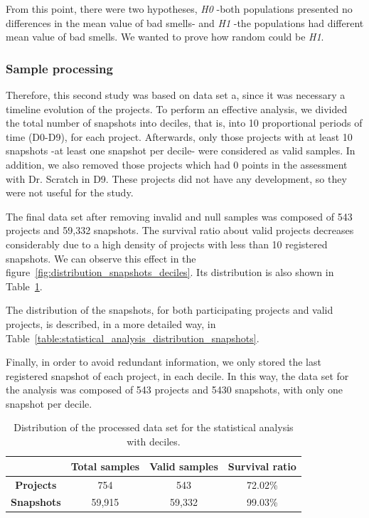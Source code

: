 From this point, there were two hypotheses, \textit{H0} -both populations presented no differences in the mean value of bad smells- and \textit{H1} -the populations had different mean value of bad smells. We wanted to prove how random could be \textit{H1}.   


\subsubsection{Sample processing}
\label{subsubsec:sample_processing}

Therefore, this second study was based on data set a, since it was necessary a timeline evolution of the projects. To perform an effective analysis, we divided the total number of snapshots into deciles, that is, into 10 proportional periods of time (D0-D9), for each project. Afterwards, only those projects with at least 10 snapshots -at least one snapshot per decile- were considered as valid samples. In addition, we also removed those projects which had 0 points in the assessment with Dr. Scratch in D9. These projects did not have any development, so they were not useful for the study. 

The final data set after removing invalid and null samples was composed of 543 projects and 59,332 snapshots. The survival ratio about valid projects decreases considerably due to a high density of projects with less than 10 registered snapshots. We can observe this effect in the figure~\ref{fig:distribution_snapshots_deciles}. Its distribution is also shown in Table~\ref{table:statistical_analysis_distribution_samples}. 

The distribution of the snapshots, for both participating projects and valid projects, is described, in a more detailed way, in Table~\ref{table:statistical_analysis_distribution_snapshots}.

Finally, in order to avoid redundant information, we only stored the last registered snapshot of each project, in each decile. In this way, the data set for the analysis was composed of 543 projects and 5430 snapshots, with only one snapshot per decile.


\begin{table}
    \centering
    \begin{tabular}{|c|c|c|c|}
        \hline
        & \textbf{Total samples} & \textbf{Valid samples} & \textbf{Survival ratio} \\ \hline
        \textbf{Projects} & 754 & 543 & 72.02\% \\ \hline
        \textbf{Snapshots} & 59,915 & 59,332 & 99.03\% \\ \hline
    \end{tabular}
    \caption{Distribution of the processed data set for the statistical analysis with deciles.}
    \label{table:statistical_analysis_distribution_samples}
\end{table}

